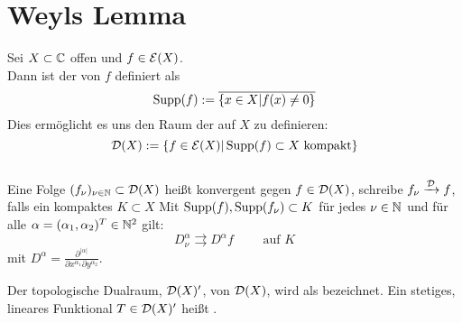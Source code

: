 
\section{Weyls Lemma}
\label{sec:Weyl}

\begin{defin}
  Sei $X \subset \mathbb{C}$ offen und $f \in \mathcal{E}(X)$. \\
  Dann ist der  von $f$ definiert als
  \[
  \operatorname{Supp}(f) := \overline{\{x \in X | f(x) \neq 0 \}}
  \]
  Dies ermöglicht es uns den Raum der  auf $X$ zu
  definieren:
  \[
  \mathcal{D}(X) := \{ f \in \mathcal{E}(X) | \operatorname{Supp}(f) \subset X \text{ kompakt} \}
  \] \\
  Eine Folge $(f_\nu)_{\nu \in \mathbb{N}} \subset \mathcal{D}(X)$ heißt konvergent
  gegen $f \in \mathcal{D}(X)$, schreibe $f_\nu \xrightarrow{\mathcal{D}} f$,
  falls ein kompaktes $K \subset X$ Mit $\operatorname{Supp}(f), \operatorname{Supp}(f_\nu)
  \subset K$ für jedes $\nu \in \mathbb{N}$ und für alle $\alpha = (\alpha_1,
  \alpha_2)^T \in \mathbb{N}^2$ gilt:
  \[
  D^\alpha_\nu \rightrightarrows D^\alpha f \qquad \text{ auf } K
  \]
  mit $D^\alpha = \frac{\partial^{|\alpha|}}{\partial
    x^{\alpha_1} \partial y^{\alpha_2}}$.
\end{defin}

\begin{defin}[Distribution]
  Der topologische Dualraum, $\mathcal{D}(X)'$, von $\mathcal{D}(X)$, wird als
   bezeichnet. Ein stetiges, lineares
  Funktional $T \in \mathcal{D}(X)'$ heißt .
\end{defin}

